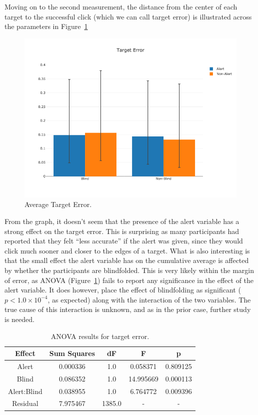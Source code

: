 \documentclass[
hidelinks,
12pt, %
oneside, %
english, %
doublespacing, %
headsepline, %
]{MastersDoctoralThesis} %
\begin{document}
Moving on to the second measurement, the distance from the center of each target to the successful click (which we can call target error) is illustrated across the parameters in Figure~\ref{fig:p2error}

\begin{figure}[h]
	\centering\includegraphics[width=1\linewidth]{images/distancetotarget}
	\decoRule
	\caption[Phase 2 Target Error]{Average Target Error.}
	\label{fig:p2error}
\end{figure}

From the graph, it doesn't seem that the presence of the alert variable has a strong effect on the target error. This is surprising as many participants had reported that they felt ``less accurate'' if the alert was given, since they would click much sooner and closer to the edges of a target. What is also interesting is that the small effect the alert variable has on the cumulative average is affected by whether the participants are blindfolded. This is very likely within the margin of error, as ANOVA (Figure~\ref{tab:p2erroranova}) fails to report any significance in the effect of the alert variable. It does however, place the effect of blindfolding as significant ($p < 1.0 \times 10^{-4}$, as expected) along with the interaction of the two variables. The true cause of this interaction is unknown, and as in the prior case, further study is needed.

\begin{table}
	\centering
	\begin{tabular}{c|cccc}
		\toprule
		Effect & Sum Squares & dF & F & p\\
		\midrule
		Alert & 0.000336 & 1.0 & 0.058371 & 0.809125\\
		Blind & 0.086352 & 1.0 & 14.995669 & 0.000113\\
		Alert:Blind & 0.038955 & 1.0 & 6.764772 & 0.009396\\
		Residual & 7.975467 & 1385.0 & - & -\\
		\bottomrule
	\end{tabular}
	\caption[Phase 1 Target Error ANOVA]{ANOVA results for target error.}
	\label{tab:p2erroranova}
\end{table}
\end{document}
